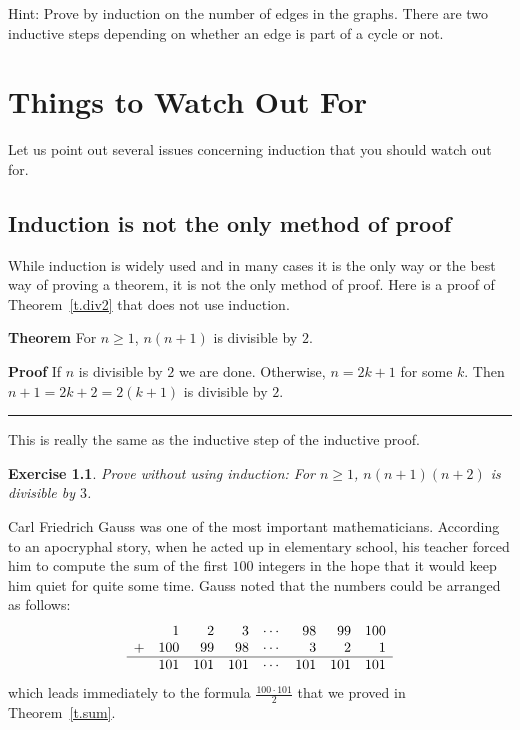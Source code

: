 \documentclass[11pt,a4paper]{report}
\newcommand*{\qed}{\hfill\rule{1ex}{1.5ex}}
\newtheorem{exercise}{Exercise}
\begin{document}
Hint: Prove by induction on the number of edges in the graphs. There are two inductive steps depending on whether an edge is part of a cycle or not.


\chapter{Things to Watch Out For}\label{s.watch}

Let us point out several issues concerning induction that you should watch out for.

\section{Induction is not the only method of proof}

While induction is widely used and in many cases it is the only way or the best way of proving a theorem, it is not the only method of proof. Here is a proof of Theorem~\ref{t.div2} that does not use induction.

\textbf{Theorem} For $n\geq 1$, $n(n+1)$ is divisible by $2$.

\textbf{Proof} If $n$ is divisible by $2$ we are done. Otherwise, $n=2k+1$ for some $k$. Then $n+1=2k+2=2(k+1)$ is divisible by $2$.\qed

This is really the same as the inductive step of the inductive proof.

\begin{exercise} Prove without using induction: For $n\geq 1$, $n(n+1)(n+2)$ is divisible by $3$.
\end{exercise}

Carl Friedrich Gauss was one of the most important mathematicians. According to an apocryphal story, when he acted up in elementary school, his teacher forced him to compute the sum of the first $100$ integers in the hope that it would keep him quiet for quite some time. Gauss noted that the numbers could be arranged as follows:
\[
\begin{array}{crrrrrrr}
& 1 & 2 & 3 & \cdots & 98 & 99 & 100\\
+& 100 & 99 & 98 & \cdots & 3 & 2 & 1\\
\hline
& 101 & 101 & 101 & \cdots & 101 & 101 & 101\\
\end{array}
\]
which leads immediately to the formula $\frac{100\cdot 101}{2}$ that we proved in Theorem~\ref{t.sum}. 
\end{document}
